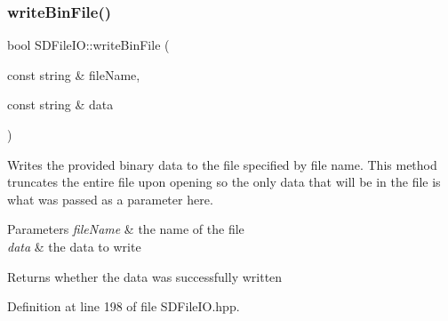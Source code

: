 \subsubsection{\texorpdfstring{writeBinFile()}{writeBinFile()}}
{\footnotesize\ttfamily bool S\+D\+File\+I\+O\+::write\+Bin\+File (\begin{DoxyParamCaption}\item[{const string \&}]{file\+Name,  }\item[{const string \&}]{data }\end{DoxyParamCaption})\hspace{0.3cm}{\ttfamily [inline]}}

Writes the provided binary data to the file specified by file name. This method truncates the entire file upon opening so the only data that will be in the file is what was passed as a parameter here.


\begin{DoxyParams}{Parameters}
{\em file\+Name} & the name of the file \\
\hline
{\em data} & the data to write \\
\hline
\end{DoxyParams}
\begin{DoxyReturn}{Returns}
whether the data was successfully written 
\end{DoxyReturn}


Definition at line 198 of file S\+D\+File\+I\+O.\+hpp.


\begin{DoxyCode}{0}

\end{DoxyCode}
\mbox{\label{classSDFileIO_a87a48c4dfedceff48a209e951f299ee9}} 
